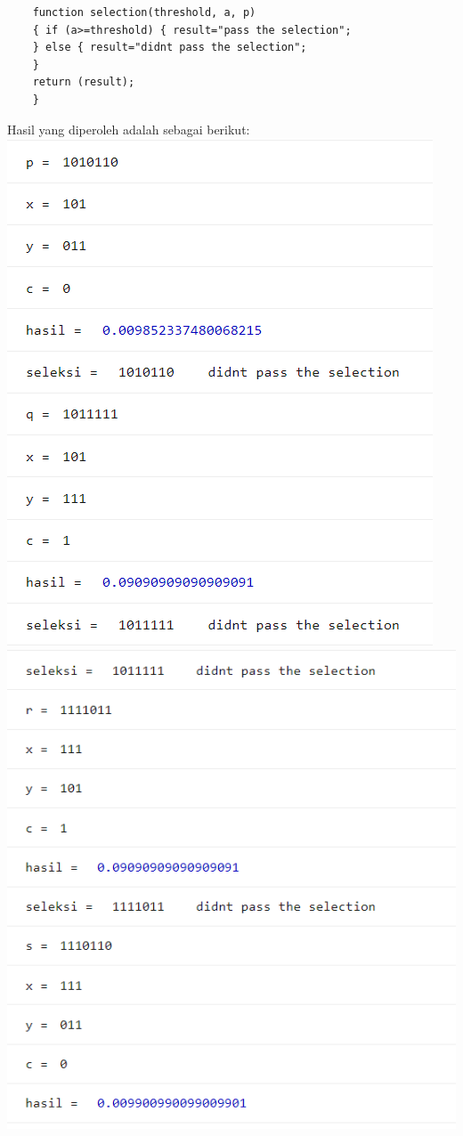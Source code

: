 \documentclass[12pt]{article}
\begin{document}
\begin{enumerate}[label=(\alph*)]
\begin{verbatim}
  	function selection(threshold, a, p)
  	{ if (a>=threshold) { result="pass the selection";
  	} else { result="didnt pass the selection";
  	}
  	return (result);
  	}
  	\end{verbatim}
  	Hasil yang diperoleh adalah sebagai berikut:\\
  	\includegraphics[scale=1]{UASFiskom0402.png}\\
  	\includegraphics[scale=1]{UASFiskom0403.png}\\

\end{enumerate}
\end{document}
